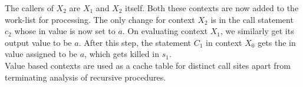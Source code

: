 The callers of $X_2$ are $X_1$ and $X_2$ itself. Both these contexts are now added to the work-list for processing. The only change for context $X_2$ is in the call statement $c_2$ whose in value is now set to $a$. On evaluating context $X_1$, we similarly get its output value to be $a$. After this step, the statement $C_1$ in context $X_0$ gets the in value assigned to be $a$, which gets killed in $s_1$.  \\

%
Value based contexts are used as a cache table for distinct call sites apart from terminating analysis of recursive procedures. 


